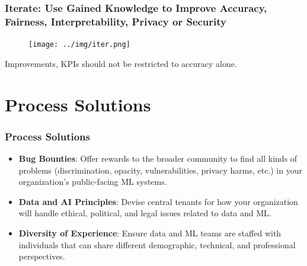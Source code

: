 \documentclass[11pt,
               aspectratio=169,
               hyperref={colorlinks}
               ]{beamer}
\begin{document}
			\begin{frame}	
	
				\frametitle{Iterate: Use Gained Knowledge to Improve Accuracy, Fairness, Interpretability, Privacy or Security}		
				
				\begin{figure}[htb]
					\begin{center}
						\texttt{[image: ../img/iter.png]}
						\label{fig:blueprint}
					\end{center}
				\end{figure}	
	
				\centering
				Improvements, KPIs should not be restricted to accuracy alone.
			
			\end{frame}

	\section{Process Solutions}

		\begin{frame}
	
			\frametitle{Process Solutions}
			
			\begin{itemize}
				
				\item \textbf{Bug Bounties}: Offer rewards to the broader community to find all kinds of problems (discrimination, opacity, vulnerabilities, privacy harms, etc.) in your organization's public-facing ML systems. 
				
				\item \textbf{Data and AI Principles}: Devise central tenants for how your organization will handle ethical, political, and legal issues related to data and ML.
				
				\item \textbf{Diversity of Experience}: Ensure data and ML teams are staffed with individuals that can share different demographic, technical, and professional perspectives. 
				
			\end{itemize}
					
		\end{frame}
		
\end{document}
